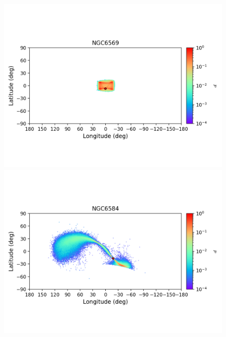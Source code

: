 \begin{figure}
\begin{center}
                \includegraphics[clip=true, trim = 0mm 20mm 0mm 10mm, width=1\columnwidth]{images/error_plots_NGC6569.png}
                \includegraphics[clip=true, trim = 0mm 20mm 0mm 10mm, width=1\columnwidth]{images/error_plots_NGC6584.png}
                

\end{center}
\end{figure}
